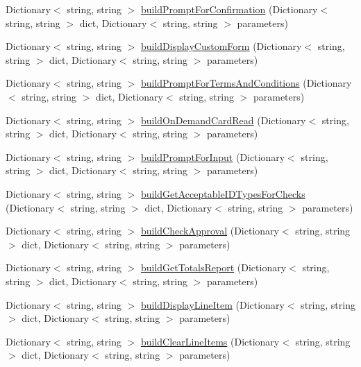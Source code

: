 \begin{DoxyCompactItemize}
Dictionary$<$ string, string $>$ \mbox{\hyperlink{class_form_sim_1_1_h_t_t_p_handler_a4789d729c73cbc504c637df203773492}{build\+Prompt\+For\+Confirmation}} (Dictionary$<$ string, string $>$ dict, Dictionary$<$ string, string $>$ parameters)
\item 
Dictionary$<$ string, string $>$ \mbox{\hyperlink{class_form_sim_1_1_h_t_t_p_handler_a4cba54d2579ac2e2d4092e4a82c86d78}{build\+Display\+Custom\+Form}} (Dictionary$<$ string, string $>$ dict, Dictionary$<$ string, string $>$ parameters)
\item 
Dictionary$<$ string, string $>$ \mbox{\hyperlink{class_form_sim_1_1_h_t_t_p_handler_a0ad2f72ce6831fbe465bdb719216b002}{build\+Prompt\+For\+Terms\+And\+Conditions}} (Dictionary$<$ string, string $>$ dict, Dictionary$<$ string, string $>$ parameters)
\item 
Dictionary$<$ string, string $>$ \mbox{\hyperlink{class_form_sim_1_1_h_t_t_p_handler_a13ec56dae880175a2819b233a784fa58}{build\+On\+Demand\+Card\+Read}} (Dictionary$<$ string, string $>$ dict, Dictionary$<$ string, string $>$ parameters)
\item 
Dictionary$<$ string, string $>$ \mbox{\hyperlink{class_form_sim_1_1_h_t_t_p_handler_ab744b8ed04ff82ee322455a18010088e}{build\+Prompt\+For\+Input}} (Dictionary$<$ string, string $>$ dict, Dictionary$<$ string, string $>$ parameters)
\item 
Dictionary$<$ string, string $>$ \mbox{\hyperlink{class_form_sim_1_1_h_t_t_p_handler_a8163fc14a37997892b3ef79dbd8bc102}{build\+Get\+Acceptable\+I\+D\+Types\+For\+Checks}} (Dictionary$<$ string, string $>$ dict, Dictionary$<$ string, string $>$ parameters)
\item 
Dictionary$<$ string, string $>$ \mbox{\hyperlink{class_form_sim_1_1_h_t_t_p_handler_a140dfbd9d5456ac5cf76ff62cb0038ab}{build\+Check\+Approval}} (Dictionary$<$ string, string $>$ dict, Dictionary$<$ string, string $>$ parameters)
\item 
Dictionary$<$ string, string $>$ \mbox{\hyperlink{class_form_sim_1_1_h_t_t_p_handler_a44257bb4e9b6bec6569b19c9cd2114ac}{build\+Get\+Totals\+Report}} (Dictionary$<$ string, string $>$ dict, Dictionary$<$ string, string $>$ parameters)
\item 
Dictionary$<$ string, string $>$ \mbox{\hyperlink{class_form_sim_1_1_h_t_t_p_handler_a2f2aac001bdf4dd8fe64303c65532c5d}{build\+Display\+Line\+Item}} (Dictionary$<$ string, string $>$ dict, Dictionary$<$ string, string $>$ parameters)
\item 
Dictionary$<$ string, string $>$ \mbox{\hyperlink{class_form_sim_1_1_h_t_t_p_handler_a79ebd2df24f5098987e523c9c0bd6da4}{build\+Clear\+Line\+Items}} (Dictionary$<$ string, string $>$ dict, Dictionary$<$ string, string $>$ parameters)

\end{DoxyCompactItemize}
